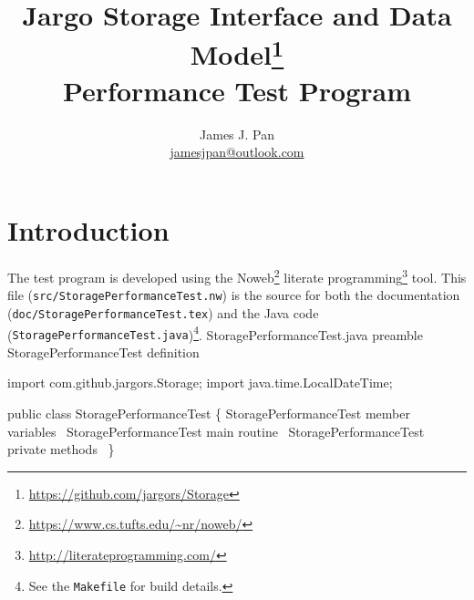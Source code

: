 \documentclass{article}
\title{Jargo Storage Interface
  and Data Model\footnote{\url{https://github.com/jargors/Storage}}\\
  \vspace{.5em}
  \Large{\textbf{Performance Test Program}}}
\author{James J. Pan\\
  \small{\href{mailto:jamesjpan@outlook.com}{jamesjpan@outlook.com}}
}
\def\nwendcode{\endtrivlist \endgroup}
\let\nwdocspar=\par
\begin{document}
\maketitle
\pagestyle{noweb}


\tableofcontents

\section{Introduction}
\label{sec:introduction}
The test program is developed using the
Noweb\footnote{\url{https://www.cs.tufts.edu/~nr/noweb/}} literate
programming\footnote{\url{http://literateprogramming.com/}} tool.  This file
({\tt{}src/StoragePerformanceTest.nw}) is the source for both the documentation
({\tt{}doc/StoragePerformanceTest.tex}) and the Java code
({\tt{}StoragePerformanceTest.java})\footnote{See the {\tt{}Makefile} for build
details.}.
\endmoddef{}
\LA{}StoragePerformanceTest.java preamble~{\nwtagstyle{}}\RA{}
\LA{}\code{}StoragePerformanceTest\edoc{} definition~{\nwtagstyle{}}\RA{}
\nwendcode{}\nwdocspar

\nwenddocs{}\endmoddef{}
import com.github.jargors.Storage;
import java.time.LocalDateTime;
\nwendcode{}\nwdocspar

\nwenddocs{}\endmoddef{}
public class StoragePerformanceTest \{
  \LA{}\code{}StoragePerformanceTest\edoc{} member variables~{\nwtagstyle{}}\RA{}
  \LA{}\code{}StoragePerformanceTest\edoc{} main routine~{\nwtagstyle{}}\RA{}
  \LA{}\code{}StoragePerformanceTest\edoc{} private methods~{\nwtagstyle{}}\RA{}
\}
\nwendcode{}\nwdocspar
\nwenddocs{}\endmoddef{}
\nwendcode{}%
\end{document}

